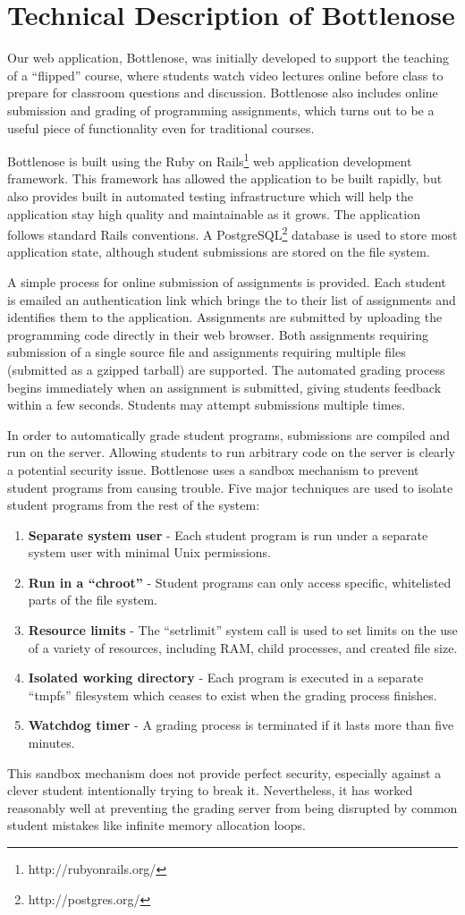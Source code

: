 \section{Technical Description of Bottlenose}

Our web application, Bottlenose, was initially developed to support
the teaching of a ``flipped'' course, where students watch video
lectures online before class to prepare for classroom questions and
discussion. Bottlenose also includes online submission and grading of
programming assignments, which turns out to be a useful piece of
functionality even for traditional courses.

Bottlenose is built using the Ruby on
Rails\footnote{http://rubyonrails.org/} web application development
framework. This framework has allowed the application to be built
rapidly, but also provides built in automated testing infrastructure
which will help the application stay high quality and maintainable as
it grows. The application follows standard Rails conventions. A
PostgreSQL\footnote{http://postgres.org/} database is used to store
most application state, although student submissions are stored on the
file system.

A simple process for online submission of assignments is
provided. Each student is emailed an authentication link which brings
the to their list of assignments and identifies them to the
application. Assignments are submitted by uploading the programming
code directly in their web browser. Both assignments requiring
submission of a single source file and assignments requiring multiple
files (submitted as a gzipped tarball) are supported. The automated
grading process begins immediately when an assignment is submitted,
giving students feedback within a few seconds.  Students may attempt
submissions multiple times.

In order to automatically grade student programs, submissions are
compiled and run on the server. Allowing students to run arbitrary
code on the server is clearly a potential security issue.  Bottlenose
uses a sandbox mechanism to prevent student programs from causing
trouble. Five major techniques are used to isolate student programs
from the rest of the system:

\begin{enumerate}
\item \textbf{Separate system user} - Each student program is run under 
  a separate system user with minimal Unix permissions.
\item \textbf{Run in a ``chroot''} - Student programs can only access
  specific, whitelisted parts of the file system.
\item \textbf{Resource limits} - The ``setrlimit'' system call is used to
  set limits on the use of a variety of resources, including RAM, child
  processes, and created file size.
\item \textbf{Isolated working directory} - Each program is executed in
  a separate ``tmpfs'' filesystem which ceases to exist when the grading
  process finishes.
\item \textbf{Watchdog timer} - A grading process is terminated if it lasts
  more than five minutes.
\end{enumerate}

This sandbox mechanism does not provide perfect security, especially
against a clever student intentionally trying to break
it. Nevertheless, it has worked reasonably well at preventing the
grading server from being disrupted by common student mistakes like
infinite memory allocation loops.
